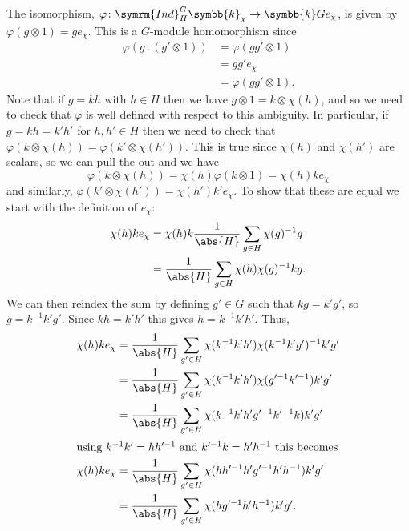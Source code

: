 \documentclass[fleqn]{NotesClass}
\renewcommand{\field}{\symbb{k}}
\newcommand{\action}{\mathbin{.}}
\newcommand{\Ind}{\symrm{Ind}}
\begin{document}
\begin{exm}{}{}
        The isomorphism, \(\varphi \colon \Ind^G_H \field_{\chi} \to \field G e_\chi\), is given by \(\varphi(g \otimes 1) = ge_\chi\).
        This is a \(G\)-module homomorphism since
        \begin{align}
            \varphi(g \action (g' \otimes 1)) &= \varphi(gg' \otimes 1)\\
            &= gg'e_\chi\\
            &= \varphi(gg' \otimes 1).
        \end{align}
        Note that if \(g = kh\) with \(h \in H\) then we have \(g \otimes 1 = k \otimes \chi(h)\), and so we need to check that \(\varphi\) is well defined with respect to this ambiguity.
        In particular, if \(g = kh = k'h'\) for \(h, h' \in H\) then we need to check that \(\varphi(k \otimes \chi(h)) = \varphi(k' \otimes \chi(h'))\).
        This is true since \(\chi(h)\) and \(\chi(h')\) are scalars, so we can pull the out and we have
        \begin{equation}
            \varphi(k \otimes \chi(h)) = \chi(h)\varphi(k \otimes 1) = \chi(h) ke_\chi
        \end{equation}
        and similarly, \(\varphi(k' \otimes \chi(h')) = \chi(h')k' e_\chi\).
        To show that these are equal we start with the definition of \(e_\chi\):
        \begin{align}
            \chi(h)ke_\chi &= \chi(h)k \frac{1}{\abs{H}} \sum_{g \in H} \chi(g)^{-1}g\\
            &= \frac{1}{\abs{H}} \sum_{g \in H} \chi(h)\chi(g)^{-1} kg.
        \end{align}
        We can then reindex the sum by defining \(g' \in G\) such that \(kg = k'g'\), so \(g = k^{-1}k'g'\).
        Since \(kh = k'h'\) this gives \(h = k^{-1}k'h'\).
        Thus,
        \begin{align}
            \chi(h)ke_\chi &= \frac{1}{\abs{H}} \sum_{g' \in H} \chi(k^{-1}k'h')\chi(k^{-1}k'g')^{-1} k'g'\\
            &= \frac{1}{\abs{H}} \sum_{g' \in H} \chi(k^{-1}k'h')\chi(g'^{-1}k'^{-1}) k'g'\\
            &= \frac{1}{\abs{H}} \sum_{g' \in H} \chi(k^{-1}k'h' g'^{-1}k'^{-1}k) k'g'\\
            \shortintertext{using \(k^{-1}k' = hh'^{-1}\) and \(k'^{-1}k = h'h^{-1}\) this becomes}
            \chi(h)ke_\chi &= \frac{1}{\abs{H}} \sum_{g' \in H} \chi(hh'^{-1} h' g'^{-1}h'h^{-1}) k'g'\\
            &= \frac{1}{\abs{H}} \sum_{g' \in H} \chi(h g'^{-1}h'h^{-1}) k'g'.

\end{align}
\end{exm}
\end{document}
